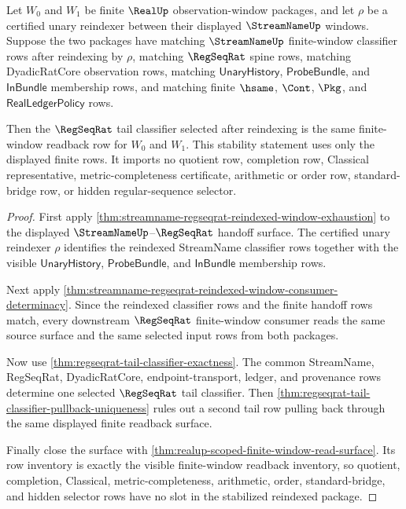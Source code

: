 \begin{theorem}
\label{thm:regseqrat-tail-classifier-reindexing-stability}
Let $W_0$ and $W_1$ be finite $\RealUp$ observation-window packages, and let
$\rho$ be a certified unary reindexer between their displayed
$\StreamNameUp$ windows. Suppose the two packages have matching
$\StreamNameUp$ finite-window classifier rows after reindexing by $\rho$,
matching $\RegSeqRat$ spine rows, matching DyadicRatCore observation rows,
matching $\mathsf{UnaryHistory}$, $\mathsf{ProbeBundle}$, and
$\mathsf{InBundle}$ membership rows, and matching finite $\hsame$, $\Cont$,
$\Pkg$, and $\mathsf{RealLedgerPolicy}$ rows.

Then the $\RegSeqRat$ tail classifier selected after reindexing is the same
finite-window readback row for $W_0$ and $W_1$. This stability statement uses
only the displayed finite rows. It imports no quotient row, completion row,
Classical representative, metric-completeness certificate, arithmetic or order
row, standard-bridge row, or hidden regular-sequence selector.
\end{theorem}
\begin{proof}
First apply
\autoref{thm:streamname-regseqrat-reindexed-window-exhaustion} to the displayed
$\StreamNameUp$--$\RegSeqRat$ handoff surface. The certified unary reindexer
$\rho$ identifies the reindexed StreamName classifier rows together with the
visible $\mathsf{UnaryHistory}$, $\mathsf{ProbeBundle}$, and
$\mathsf{InBundle}$ membership rows.

Next apply
\autoref{thm:streamname-regseqrat-reindexed-window-consumer-determinacy}. Since
the reindexed classifier rows and the finite handoff rows match, every
downstream $\RegSeqRat$ finite-window consumer reads the same source surface and
the same selected input rows from both packages.

Now use \autoref{thm:regseqrat-tail-classifier-exactness}. The common
StreamName, RegSeqRat, DyadicRatCore, endpoint-transport, ledger, and provenance
rows determine one selected $\RegSeqRat$ tail classifier. Then
\autoref{thm:regseqrat-tail-classifier-pullback-uniqueness} rules out a second
tail row pulling back through the same displayed finite readback surface.

Finally close the surface with
\autoref{thm:realup-scoped-finite-window-read-surface}. Its row inventory is
exactly the visible finite-window readback inventory, so quotient, completion,
Classical, metric-completeness, arithmetic, order, standard-bridge, and hidden
selector rows have no slot in the stabilized reindexed package.
\end{proof}


